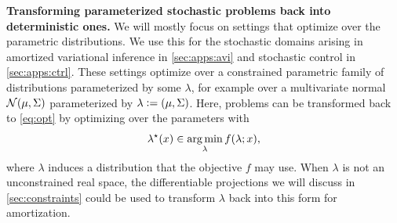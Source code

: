 \documentclass[twoside,11pt]{article}
\begin{document}
\textbf{Transforming parameterized stochastic problems
  back into deterministic ones.}
We will mostly focus on settings that optimize over
the parametric distributions.
We use this for the stochastic domains arising in amortized
variational inference in \cref{sec:apps:avi} and stochastic
control in \cref{sec:apps:ctrl}.
These settings optimize over a constrained parametric family
of distributions parameterized by some $\lambda$, for example
over a multivariate normal ${\mathcal{N}}(\mu, \Sigma)$ parameterized
by $\lambda\vcentcolon= (\mu, \Sigma)$.
Here, problems can be transformed back to \cref{eq:opt} by
optimizing over the parameters with
\begin{equation}
  \lambda^\star(x) \in \operatorname*{arg\,min}_{\lambda} f(\lambda; x),
  \label{eq:normal-opt}
\end{equation}
where $\lambda$ induces a distribution that the
objective $f$ may use.
When $\lambda$ is not an unconstrained real space, the
differentiable projections we will discuss in \cref{sec:constraints}
could be used to transform $\lambda$ back into this form for amortization.
\end{document}
